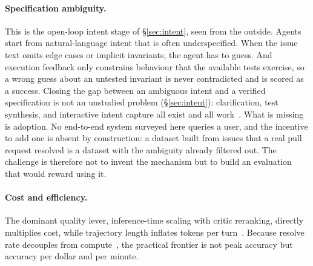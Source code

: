 \documentclass[
  english,        %
  font=times,     %
  twocolumn,      %
]{tumarticle}
\begin{document}
\paragraph{Specification ambiguity.}
This is the open-loop intent stage of \S\ref{sec:intent}, seen from the outside.
Agents start from natural-language intent that is often underspecified. When the
issue text omits edge cases or implicit invariants, the agent has to guess. And
execution feedback only constrains behaviour that the available tests exercise, so
a wrong guess about an untested invariant is never contradicted and is scored as a
success. Closing the gap between an ambiguous intent and a verified specification
is not an unstudied problem (\S\ref{sec:intent}): clarification, test synthesis,
and interactive intent capture all exist and all
work~\cite{lahiri2022ticoder,mu2024clarifygpt,vijayvargiya2026ambiguity}. What is
missing is adoption. No end-to-end system surveyed here queries a user, and the
incentive to add one is absent by construction: a dataset built from issues that a
real pull request resolved is a dataset with the ambiguity already filtered out.
The challenge is therefore not to invent the mechanism but to build an evaluation
that would reward using it.

\paragraph{Cost and efficiency.}
The dominant quality lever, inference-time scaling with critic reranking, directly
multiplies cost, while trajectory length inflates tokens per
turn~\cite{turncontrol2025}. Because resolve rate decouples from
compute~\cite{sweeffi2025}, the practical frontier is not peak accuracy but
accuracy per dollar and per minute.
\end{document}
